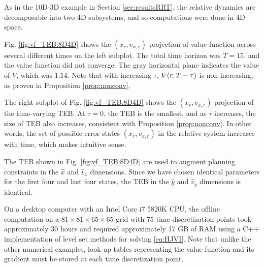 As in the 10D-3D example in Section \ref{sec:resultsRRT}, the relative dynamics are decomposable into two 4D subsystems, and so computations were done in 4D space.

Fig. \ref{fig:vf_TEB:8D4D} shows the $(x_r, v_{x,r})$-projection of value function across several different times on the left subplot.
The total time horizon was $T=15$, and the value function did not converge.
The gray horizontal plane indicates the value of $\underline V$, which was $1.14$.
Note that with increasing $\tau$, $V(r,T-\tau)$ is non-increasing, as proven in Proposition \ref{prop:nonconv}.

The right subplot of Fig. \ref{fig:vf_TEB:8D4D} shows the $(x_r, v_{x,r})$-projection of the time-varying TEB.
At $\tau=0$, the TEB is the smallest, and as $\tau$ increases, the size of TEB also increases, consistent with Proposition \ref{prop:nonconv}.
In other words, the set of possible error states $(x_r, v_{x,r})$ in the relative system increases with time, which makes intuitive sense.

The TEB shown in Fig. \ref{fig:vf_TEB:8D4D} are used to augment planning constraints in the $\hat x$ and $\hat v_x$ dimensions.
Since we have chosen identical parameters for the first four and last four states, the TEB in the $\hat y$ and $\hat v_y$ dimensions is identical.

On a desktop computer with an Intel Core i7 5820K CPU, the offline computation on a $81\times81\times65\times65$ grid with $75$ time discretization points took approximately 30 hours and  required approximately 17 GB of RAM using a C++ implementation of level set methods for solving \eqref{eq:HJVI}.
Note that unlike the other numerical examples, look-up tables representing the value function and its gradient must be stored at each time discretization point.

